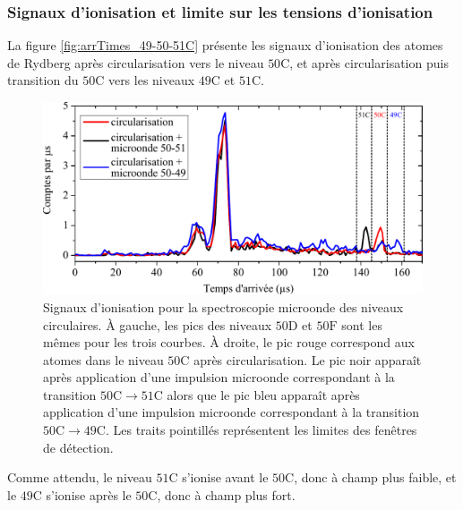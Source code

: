 	\subsubsection*{Signaux d'ionisation et limite sur les tensions d'ionisation}
\noindent La figure \eqref{fig:arrTimes_49-50-51C} présente les signaux d'ionisation des atomes de Rydberg après circularisation vers le niveau $\mathrm{50C}$, et après circularisation puis transition du $\mathrm{50C}$ vers les niveaux $\mathrm{49C}$ et $\mathrm{51C}$.
%
\begin{figure}[h]
\centering
\includegraphics[width=.85\linewidth]{figures/circulars/arrTimes_49-50-51C}
\caption[Signaux d'ionisation pour la spectroscopie microonde des niveaux circulaires]{
Signaux d'ionisation pour la spectroscopie microonde des niveaux circulaires.
À gauche, les pics des niveaux $\mathrm{50D}$ et $\mathrm{50F}$ sont les mêmes pour les trois courbes.
À droite, le pic rouge correspond aux atomes dans le niveau $\mathrm{50C}$ après circularisation.
Le pic noir apparaît après application d'une impulsion microonde correspondant à la transition $\mathrm{50C}\rightarrow \mathrm{51C}$ alors que le pic bleu apparaît après application d'une impulsion microonde correspondant à la transition $\mathrm{50C}\rightarrow \mathrm{49C}$.
Les traits pointillés représentent les limites des fenêtres de détection.
}
\label{fig:arrTimes_49-50-51C}
\end{figure}
%
Comme attendu, le niveau $\mathrm{51C}$ s'ionise avant le $\mathrm{50C}$, donc à champ plus faible, et le $\mathrm{49C}$ s'ionise après le $\mathrm{50C}$, donc à champ plus fort.

